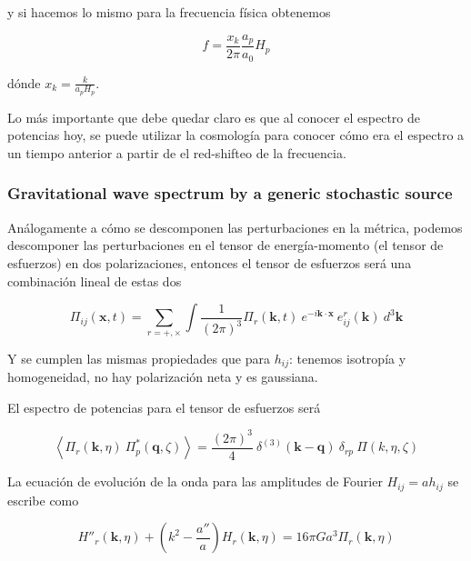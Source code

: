 \noindent
y si hacemos lo mismo para la frecuencia física obtenemos

\begin{equation}
    f = \frac{x_k}{2 \pi} \frac{a_p}{a_0} H_p
\end{equation}

\noindent
dónde $\displaystyle x_k = \frac{k}{a_p H_p}$. 

Lo más importante que debe quedar claro es que al conocer el espectro de potencias hoy, se puede utilizar la cosmología para conocer cómo era el espectro a un tiempo anterior a partir de el red-shifteo de la frecuencia.

\subsubsection{Gravitational wave spectrum by a generic stochastic source}

Análogamente a cómo se descomponen las perturbaciones en la métrica, podemos descomponer las perturbaciones en el tensor de energía-momento (el tensor de esfuerzos) en dos polarizaciones, entonces el tensor de esfuerzos será una combinación lineal de estas dos

\begin{equation}
    \Pi_{ij} (\textbf{x}, t) = \sum_{r = +, \times} \int \frac{1}{(2 \pi)^3} \Pi_r (\textbf{k}, t) \ e^{-i \textbf{k} \cdot \textbf{x}} \ e^r_{ij} (\textbf{k}) \ d^3 \textbf{k}
\end{equation}

Y se cumplen las mismas propiedades que para $h_{ij}$: tenemos isotropía y homogeneidad, no hay polarización neta y es gaussiana.

El espectro de potencias para el tensor de esfuerzos será

\begin{equation}
    \left\langle \Pi_r (\textbf{k}, \eta) \ \Pi_p^* (\textbf{q}, \zeta) \right\rangle = \frac{(2 \pi)^3}{4} \ \delta^{(3)} (\textbf{k} - \textbf{q}) \ \delta_{rp} \ \Pi (k, \eta, \zeta)
\end{equation}

La ecuación de evolución de la onda para las amplitudes de Fourier $H_{ij} = a h_{ij}$ se escribe como

\begin{equation}
    H''_r (\textbf{k}, \eta) + \left( k^2 - \frac{a''}{a} \right) H_r (\textbf{k}, \eta) = 16 \pi G a^3 \Pi_r (\textbf{k}, \eta)
\end{equation}

